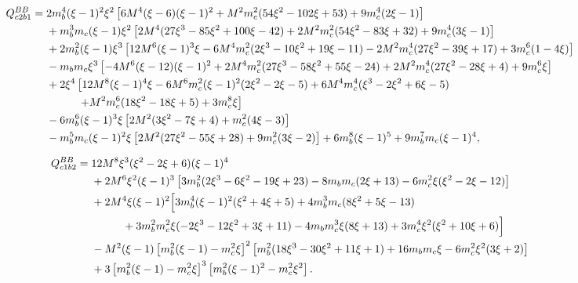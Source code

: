 \documentclass[11pt]{article}
\begin{document}
\begin{landscape}
\begin{align}
Q^{BB}_{c2b1}={}&
2m_b^4(\xi-1)^2\xi^2
\left[6M^4(\xi-6)(\xi-1)^2+M^2m_c^2(54\xi^2-102\xi+53)+9m_c^4(2\xi-1)\right]\nonumber\\
&+m_b^3m_c(\xi-1)\xi^2
\left[2M^4(27\xi^3-85\xi^2+100\xi-42)+2M^2m_c^2(54\xi^2-83\xi+32)+9m_c^4(3\xi-1)\right]\nonumber\\
&+2m_b^2(\xi-1)\xi^3
\left[12M^6(\xi-1)^3\xi-6M^4m_c^2(2\xi^3-10\xi^2+19\xi-11)
-2M^2m_c^4(27\xi^2-39\xi+17)+3m_c^6(1-4\xi)\right]\nonumber\\
&-m_bm_c\xi^3
\left[-4M^6(\xi-12)(\xi-1)^2+2M^4m_c^2(27\xi^3-58\xi^2+55\xi-24)
+2M^2m_c^4(27\xi^2-28\xi+4)+9m_c^6\xi\right]\nonumber\\
&+2\xi^4
\left[12M^8(\xi-1)^4\xi-6M^6m_c^2(\xi-1)^2(2\xi^2-2\xi-5)
+6M^4m_c^4(\xi^3-2\xi^2+6\xi-5)\right.\nonumber\\
&\hspace{1.0cm}\left.
+M^2m_c^6(18\xi^2-18\xi+5)+3m_c^8\xi\right]\nonumber\\
&-6m_b^6(\xi-1)^3\xi
\left[2M^2(3\xi^2-7\xi+4)+m_c^2(4\xi-3)\right]\nonumber\\
&-m_b^5m_c(\xi-1)^2\xi
\left[2M^2(27\xi^2-55\xi+28)+9m_c^2(3\xi-2)\right]
+6m_b^8(\xi-1)^5+9m_b^7m_c(\xi-1)^4,
\end{align}

\begin{align}
Q^{BB}_{c1b2}={}&
12M^8\xi^3(\xi^2-2\xi+6)(\xi-1)^4\nonumber\\
&+2M^6\xi^2(\xi-1)^3
\left[3m_b^2(2\xi^3-6\xi^2-19\xi+23)-8m_bm_c(2\xi+13)
-6m_c^2\xi(\xi^2-2\xi-12)\right]\nonumber\\
&+2M^4\xi(\xi-1)^2
\Big[3m_b^4(\xi-1)^2(\xi^2+4\xi+5)
+4m_b^3m_c(8\xi^2+5\xi-13)\nonumber\\
&\hspace{1.0cm}
+3m_b^2m_c^2\xi(-2\xi^3-12\xi^2+3\xi+11)
-4m_bm_c^3\xi(8\xi+13)+3m_c^4\xi^2(\xi^2+10\xi+6)\Big]\nonumber\\
&-M^2(\xi-1)\left[m_b^2(\xi-1)-m_c^2\xi\right]^2
\left[m_b^2(18\xi^3-30\xi^2+11\xi+1)+16m_bm_c\xi-6m_c^2\xi^2(3\xi+2)\right]\nonumber\\
&+3\left[m_b^2(\xi-1)-m_c^2\xi\right]^3
\left[m_b^2(\xi-1)^2-m_c^2\xi^2\right].
\end{align}

\endgroup
\end{landscape}
\end{document}
